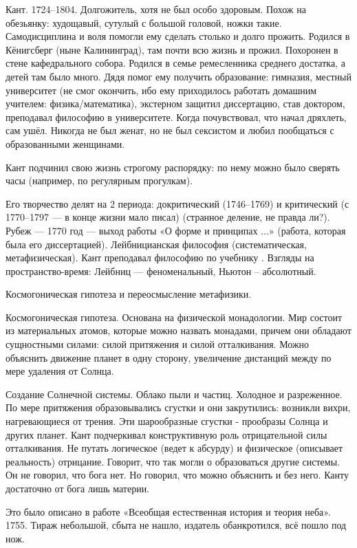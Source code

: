 Кант. 1724--1804. Долгожитель, хотя не был особо здоровым. Похож на обезьянку: худощавый, сутулый с большой головой, ножки такие. Самодисциплина и воля помогли ему сделать столько и долго прожить.
Родился в Кёнигсберг (ныне Калининград), там почти всю жизнь и прожил.
Похоронен в стене кафедрального собора. 
Родился в семье ремесленника среднего достатка, а детей там было много. Дядя помог ему получить образование: гимназия, местный университет (не смог окончить, ибо ему приходилось работать домашним учителем: физика/математика), экстерном защитил диссертацию, став доктором, преподавал философию в университете. Когда почувствовал, что начал дряхлеть, сам ушёл. Никогда не был женат, но не был сексистом и любил пообщаться с образованными женщинами.

Кант подчинил свою жизнь строгому распорядку: по нему можно было сверять часы (например, по регулярным прогулкам). 

Его творчество делят на 2 периода: докритический (1746--1769) и критический (с 1770--1797 --- в конце жизни мало писал) (странное деление, не правда ли?).  Рубеж --- 1770 год --- выход работы «О форме и принципах ...» (работа, которая была его диссертацией). 
Лейбницианская философия (систематическая, метафизическая). Кант преподавал философию по учебнику \na.
Взгляды на пространство-время: Лейбниц --- феноменальный, Ньютон -- абсолютный.

Космогоническая гипотеза и переосмысление метафизики. 

Космогоническая гипотеза. Основана на физической монадологии. 
Мир состоит из материальных атомов, которые можно назвать монадами, причем они обладают сущностными силами: силой притяжения и силой отталкивания.
Можно объяснить движение планет в одну сторону, увеличение дистанций между по мере удаления от Солнца.

Создание Солнечной системы. Облако пыли и частиц. Холодное и разреженное. По мере притяжения образовывались сгустки и они закрутились: возникли вихри, нагревающиеся от трения. 
Эти шарообразные сгустки - прообразы Солнца и других планет. Кант подчеркивал конструктивную роль отрицательной силы отталкивания. 
Не путать логическое (ведет к абсурду) и физическое (описывает реальность) отрицание. 
Говорит, что так могли о образоваться другие системы. 
Он не говорил, что бога нет. Но говорил, что можно объяснить и без него. Канту достаточно от бога лишь материи.

Это было описано в работе «Всеобщая естественная история и теория неба». 1755. Тираж небольшой, сбыта не нашло, издатель обанкротился, всё пошло под нож.